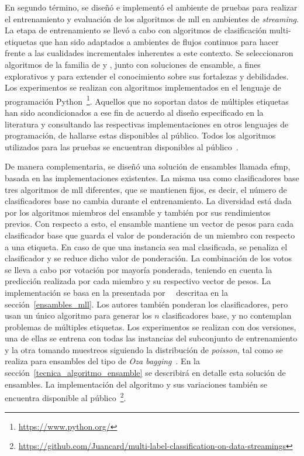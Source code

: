 En segundo término, se diseñó e implementó el ambiente de pruebas para realizar
el entrenamiento y evaluación de los algoritmos de \acrshort{mll} en ambientes
de \textit{streaming}. La etapa de entrenamiento se llevó a cabo con algoritmos
de clasificación multi-etiquetas que han sido adaptados a ambientes de flujos
continuos para hacer frente a las cualidades incrementales inherentes a este
contexto. Se seleccionaron algoritmos de la familia de  y , junto con soluciones de
ensamble, a fines explorativos y para extender el conocimiento sobre sus
fortalezas y debilidades.  Los experimentos se realizan con algoritmos
implementados en el lenguaje de programación
Python~\footnote{\url{https://www.python.org/}}.  Aquellos que no soportan datos
de múltiples etiquetas han sido acondicionados a ese fin de acuerdo al diseño
especificado en la literatura y consultando las respectivas implementaciones en
otros lenguajes de programación, de hallarse estas disponibles al público. Todos
los algoritmos utilizados para las pruebas se encuentran disponibles al
público~\cite{montiel_scikit-multiflow_2018}.

De manera complementaria, se diseñó una solución de ensambles llamada
\acrfull{efmp}, basada en las implementaciones existentes. La misma usa como
clasificadores base tres algoritmos de \acrshort{mll} diferentes, que se
mantienen fijos, es decir, el número de clasificadores base no cambia durante el
entrenamiento. La diversidad está dada por los algoritmos miembros del ensamble
y también por sus rendimientos previos. Con respecto a esto, el ensamble
mantiene un vector de pesos para cada clasificador base que guarda el valor de
ponderación de un miembro con respecto a una etiqueta. En caso de que una
instancia sea mal clasificada, se penaliza el clasificador y se reduce dicho
valor de ponderación. La combinación de los votos se lleva a cabo por votación
por mayoría ponderada, teniendo en cuenta la predicción realizada por cada
miembro y su respectivo vector de pesos. La implementación se basa en la
presentada por~\citeauthor{kolter_dynamic_2007}~\cite{kolter_dynamic_2007}
descritaa en la sección~\ref{ensambles_mll}. Los autores también ponderan los
clasificadores, pero usan un único algoritmo para generar los $n$ clasificadores
base, y no contemplan problemas de múltiples etiquetas. Los experimentos se
realizan con dos versiones, una de ellas se entrena con todas las instancias del
subconjunto de entrenamiento y la otra tomando muestreos siguiendo la
distribución de \textit{poisson}, tal como se realiza para ensambles del tipo de
\textit{Oza bagging}~\cite{oza_online_2005}. En la
sección~\ref{tecnica_algoritmo_ensamble} se describirá en detalle esta solución
de ensambles. La implementación del algoritmo y sus variaciones también se
encuentra disponible al
público~\footnote{\url{https://github.com/Juancard/multi-label-classification-on-data-streamings}}.

